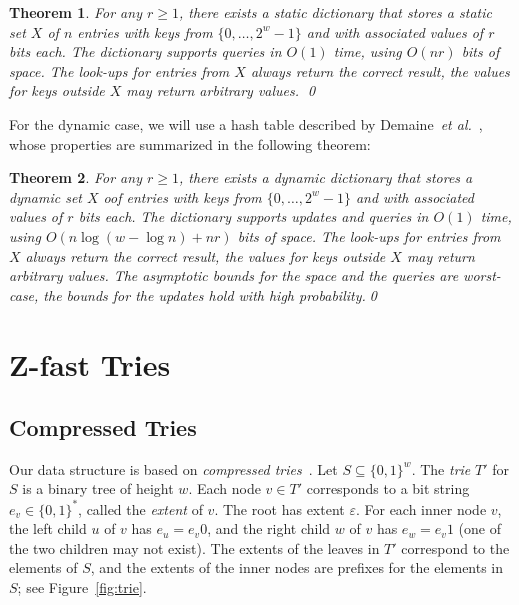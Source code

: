 \documentclass[a4paper,11pt]{article}
\newtheorem{theorem}{Theorem}[section]
\newcommand{\eps}{\varepsilon}
\newcommand{\etal}{\emph{et al.}\xspace}
\newcommand{\?}{\mskip1.5mu}
\begin{document}
\begin{theorem}\label{thm:bloomier_filter}
For any $r \geq 1$, there exists a static dictionary that
stores a static set $X$ of $n$ entries with keys 
from $\{0, \dots, 2^w-1\}$ and with 
associated values of $r$ bits each.
The dictionary supports queries in $O(1)$ time,
using $O(nr)$ \emph{bits} of space. The look-ups for entries
from $X$ always return the correct result, the values
for keys outside $X$ may return arbitrary values.
\qed
\end{theorem}


For the dynamic case, we will use a hash table described
by Demaine~\etal~\cite{DemaineMePaPa06}, whose
properties are summarized in the following theorem:

\begin{theorem}\label{thm:succinct_retrieval_only_hashtable}
For any $r \geq 1$, there exists a dynamic dictionary that
stores a dynamic set $X$ oof entries 
with keys from $\{0, \dots, 2^w-1\}$ and with 
associated values of $r$ bits each.
The dictionary supports updates and queries in $O(1)$ time,
using $O(n \log(w - \log n) + nr)$ \emph{bits} of space.
The look-ups for entries
from $X$ always return the correct result, the values
for keys outside $X$ may return arbitrary values.
The asymptotic bounds for the space and the queries are
worst-case, the bounds for the updates hold with
high probability.\qed
\end{theorem}

\section{Z-fast Tries} 

\subsection{Compressed Tries}
Our data structure is based on \emph{compressed
tries}~\cite{CormenLeRiSt09,Knuth98}. 
Let $S \subseteq \{0, 1\}^w$. The \emph{trie} $T'$ for $S$ 
is a binary tree of height $w$. Each node $v \in T'$ corresponds
to a bit string $e_v \in \{0,1\}^*$, called the \emph{extent} of $v$. 
The root has extent $\eps$. For each inner node $v$, the left child 
$u$ of $v$  has $e_u = e_v0$, and the right child $w$ of $v$ has 
$e_w = e_v1$ (one of the two children may not exist). The extents of
the leaves in $T'$ correspond to the elements of $S$, and the extents of the 
inner nodes are prefixes for the elements in $S$; see 
Figure~\ref{fig:trie}.
\end{document}
